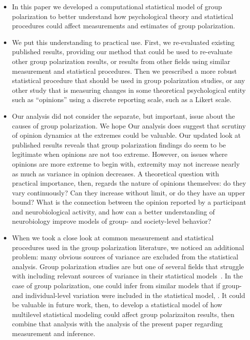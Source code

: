 \documentclass[11pt,letterpaper]{article}
\begin{document}
\begin{itemize}
  \item 
    In this paper we developed a computational statistical model of group
    polarization to better understand how psychological theory and statistical 
    procedures could affect measurements and estimates of group polarization. 
  \item
    We put this understanding to 
    practical use. First, we re-evaluated existing published results, providing our
    method that could be used to re-evaluate other group polarization results,
    or results from other fields using similar measurement and statistical
    procedures. Then we prescribed a more robust statistical procedure that should
    be used in group polarization studies, or any other study that is measuring
    changes in some theoretical psychological entity such as ``opinions'' using
    a discrete reporting scale, such as a Likert scale.
  \item
    Our analysis did not consider the separate, but important, issue about
    the causes of group polarization. We hope Our analysis does suggest that 
    scrutiny of opinion dynamics at the extremes could be valuable.
    Our updated look at 
    published results reveals that group polarization findings do seem to be
    legitimate when opinions are not too extreme. However, on issues where
    opinions are more extreme to begin with, extremity may not increase 
    nearly as much as variance in opinion decreases. 
    A theoretical question with practical importance, then, regards the
    nature of opinions themselves: do they vary continuously? Can they increase
    without limit, or do they have an upper bound? What is the connection 
    between the opinion reported by a participant and neurobiological 
    activity, and how can a better understanding of neurobiology improve
    models of group- and society-level behavior? 
  \item
    When we took a close look at common measurement and statistical procedures
    used in the group polarization literature, we noticed an additional problem: 
    many obvious sources of variance are excluded from the statistical analysis.
    Group polarization studies are but one of several fields that struggle
    with including relevant sources of variance in their statistical models~\cite{Yarkoni2021}.
    In the case of group polarization, one could infer from similar models
    that if group- and individual-level variation were included in the
    statistical model, . It could be valuable in future work, then, to 
    develop a statistical model of how multilevel statistical modeling could
    affect group polarizaiton results, then combine that analysis with the
    analysis of the present paper regarding measurement and inference.
\end{itemize}
\end{document}
